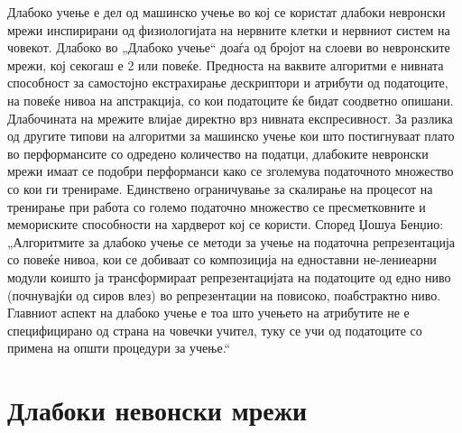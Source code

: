 Длабоко учење е дел од машинско учење во кој се користат длабоки невронски мрежи инспирирани од физиологијата на нервните клетки и нервниот систем на човекот. Длабоко во „Длабоко учење“ доаѓа од бројот на слоеви во невронските мрежи, кој секогаш е 2 или повеќе. Предноста на ваквите алгоритми е нивната способност за самостојно екстрахирање дескриптори и атрибути од податоците, на повеќе нивоа на апстракција, со кои податоците ќе бидат соодветно опишани. Длабочината на мрежите влијае директно врз нивната експресивност. За разлика од другите типови на алгоритми за машинско учење кои што постигнуваат плато во перформансите со одредено количество на податци, длабоките невронски мрежи имаат се подобри перформанси како се зголемува податочното множество со кои ги тренираме. Единствено ограничување за скалирање на процесот на тренирање при работа со големо податочно множество се пресметковните и мемориските способности на хардверот кој се користи.
Според Џошуа Бенџио: „Алгоритмите за длабоко учење се методи за учење на податочна репрезентација со повеќе нивоа, кои се добиваат со композиција на едноставни не-лениеарни модули коишто ја трансформираат репрезентацијата на податоците од едно ниво (почнувајќи од сиров влез) во репрезентации на повисоко, поабстрактно ниво. Главниот аспект на длабоко учење е тоа што учењето на атрибутите не е специфицирано од страна на човечки учител, туку се учи од податоците со примена на општи процедури за учење.“
 
\section{Длабоки невонски мрежи}

